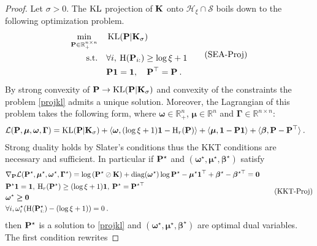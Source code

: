 \begin{proof}

Let $\sigma > 0$. The $\operatorname{KL}$ projection of $\mathbf{K}$ onto $\mathcal{H}_{\xi} \cap \mathcal{S}$ boils down to the following optimization problem.
\begin{equation}
\label{projkl}
\begin{split}
    \min_{\mathbf{P} \in \mathbb{R}_+^{n \times n}} \quad &\operatorname{KL}(\mathbf{P} | \mathbf{K}_\sigma) \\
    \text{s.t.} \quad &\forall i, \: \operatorname{H}(\mathbf{P}_{i:}) \geq \log{\xi} + 1 \\
    & \mathbf{P} \bm{1} = \bm{1}, \quad \mathbf{P}^\top = \mathbf{P} \:.
\end{split}
\tag{SEA-Proj}
\end{equation}
By strong convexity of $\mathbf{P} \rightarrow \operatorname{KL}(\mathbf{P} | \mathbf{K}_\sigma)$ and convexity of the constraints the problem \eqref{projkl} admits a unique solution. Moreover, the Lagrangian of this problem takes the following form, where $\bm{\omega} \in \mathbb{R}_+^n$, $\bm{\mu} \in \mathbb{R}^n$ and $\bm{\Gamma} \in \mathbb{R}^{n \times n}$:
\begin{align*}
    \mathcal{L}(\mathbf{P}, \bm{\mu}, \bm{\omega}, \bm{\Gamma}) &= \operatorname{KL}(\mathbf{P} | \mathbf{K}_\sigma) + \langle \bm{\omega}, (\log{\xi} + 1) \bm{1} - \operatorname{H}_r(\mathbf{P}) \rangle + \langle \bm{\mu}, \bm{1} - \mathbf{P} \bm{1} \rangle + \langle \bm{\beta}, \mathbf{P} - \mathbf{P}^\top \rangle \:.
\end{align*}
Strong duality holds by Slater's conditions thus the KKT conditions are necessary and sufficient. In particular if $\mathbf{P}^\star$ and $(\bm{\omega}^\star, \bm{\mu}^\star, \bm{\beta}^\star)$ satisfy
\begin{equation}
\label{kkt1}
\begin{split}
    &\nabla_{\mathbf{P}} \mathcal{L}(\mathbf{P}^\star, \bm{\mu}^\star, \bm{\omega}^\star, \bm{\Gamma}^\star) = \log \left( \mathbf{P}^\star \oslash \mathbf{K} \right) + \operatorname{diag}(\bm{\omega}^\star)\log{\mathbf{P}^\star} - \bm{\mu}^\star \bm{1}^\top + \bm{\beta}^\star - \bm{\beta}^{\star\top} = \bm{0} \\
    &\mathbf{P}^\star \bm{1} = \bm{1}, \: \operatorname{H}_r(\mathbf{P}^\star) \geq (\log{\xi} + 1)\bm{1}, \: \mathbf{P}^\star = \mathbf{P}^{\star \top} \\
    &\bm{\omega}^\star \bm{\geq} \bm{0} \\
    &\forall i, \omega_i^\star (\operatorname{H}(\mathbf{P}_{i:}^\star) - (\log{\xi} + 1)) = 0\:.
\end{split}
\tag{KKT-Proj}
\end{equation}
then $\mathbf{P}^\star$ is a solution to \eqref{projkl} and $(\bm{\omega}^\star, \bm{\mu}^\star, \bm{\beta}^\star)$ are optimal dual variables. The first condition rewrites

\end{proof}
